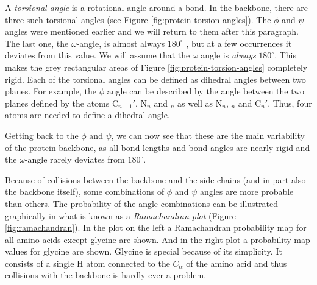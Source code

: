 A \textit{torsional angle} is a rotational angle around a bond. In the
backbone, there are three such torsional angles (see Figure
\ref{fig:protein-torsion-angles}). The $\phi$ and $\psi$ angles were
mentioned earlier and we will return to them after this paragraph. The
last one, the $\omega$-angle, is almost always $180^{\circ}$
\cite{probik}, but at a few occurrences it deviates from this
value. We will assume that the $\omega$ angle is \textit{always}
$180^{\circ}$. This makes the grey rectangular areas of Figure
\ref{fig:protein-torsion-angles} completely rigid.  Each of the
torsional angles can be defined as dihedral angles between two
planes. For example, the $\phi$ angle can be described by the angle
between the two planes defined by the atoms C$_{n-1}'$, N$_n$ and \Ca
$_n$ as well as N$_n$, \Ca $_n$ and C$_n'$. Thus, four atoms are
needed to define a dihedral angle.

Getting back to the $\phi$ and $\psi$, we can now see that these are
the main variability of the protein backbone, as all bond lengths and
bond angles are nearly rigid and the $\omega$-angle rarely
deviates from $180^\circ$. 

Because of collisions between the backbone and the side-chains (and in part also the backbone itself), some combinations of $\phi$ and $\psi$ angles are more probable than others. The probability of the angle combinations can be illustrated graphically in what is known as a
\textit{Ramachandran plot} (Figure \ref{fig:ramachandran}). In the
plot on the left a Ramachandran probability map for all
amino acids except glycine are shown. And in the right plot a probability map
values for glycine are shown. Glycine is special because of its
simplicity. It consists of a single H atom connected to the $C_\alpha$
of the amino acid and thus collisions with the backbone is hardly ever
a problem.

